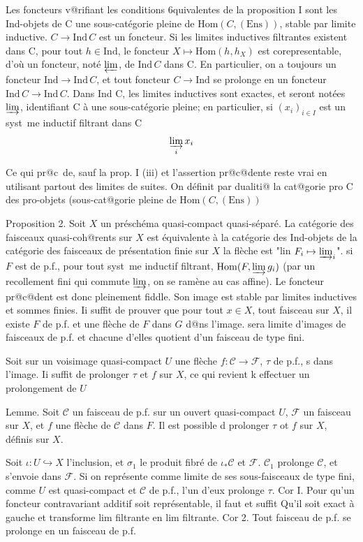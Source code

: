 \documentclass[12pt]{article}
\begin{document}
Les foncteurs v@rifiant les conditions 6quivalentes de la proposition I sont les Ind-objets de C une sous-catégorie pleine de $\mathrm{Hom}(C,(\mathrm{Ens}))$, stable par limite inductive.
$C \to \mathrm{Ind}\,C$ est un foncteur.
Si les limites inductives filtrantes existent dans C, pour tout $h\in\mathrm{Ind}$, le foncteur $X \mapsto \mathrm{Hom}(h,h_X)$ est corepresentable, d'où un foncteur, noté $\varprojlim$, de $\mathrm{Ind}\,C$ dans C.
En particulier, on a toujours un foncteur $\mathrm{Ind}\to\mathrm{Ind}\,C$, et tout foncteur $C\to\mathrm{Ind}$ se prolonge en un foncteur $\mathrm{Ind}\,C\to\mathrm{Ind}\,C$.
Dans Ind C, les limites inductives sont exactes, et seront notées $\varinjlim$, identifiant C à une sous-catégorie pleine; en particulier, si $(x_i)_{i\in I}$ est un syst~me inductif filtrant dans C
\[
\varinjlim_{i} x_{i}
\]

Ce qui pr@c~de, sauf la prop. I (iii) et l'assertion pr@c@dente reste vrai en utilisant partout des limites de suites.
On définit par dualiti@ la cat@gorie pro C des pro-objets (sous-cat@gorie pleine de $\mathrm{Hom}(C,(\mathrm{Ens}))$

Proposition 2. Soit $X$ un préschéma quasi-compact quasi-séparé. La catégorie des faisceaux quasi-coh@rents sur $X$ est équivalente à la catégorie des Ind-objets de la catégorie des faisceaux de présentation finie sur $X$
la flèche est "lin $F_i \mapsto \varinjlim_i$".
si $F$ est de p.f., pour tout syst~me inductif filtrant, $\mathrm{Hom}(F,\varinjlim g_i)$ (par un recollement fini qui commute $\varinjlim$, on se ramène au cas affine).
Le foncteur pr@c@dent est donc pleinement fiddle. Son image est stable par limites inductives et sommes finies.
Ii suffit de prouver que pour tout $x \in X$, tout faisceau sur $X$, il existe $F$ de p.f. et une flèche de $F$ dans $G$ d@ns l'image.
sera limite d'images de faisceaux de p.f. et chacune d'elles quotient d'un faisceau de type fini.

Soit sur un voisimage quasi-compact $U$ une flèche $f: \mathscr{C} \to \mathscr{F}$, $\tau$ de p.f., s dans l'image.
Ii suffit de prolonger $\tau$ et $f$ sur $X$, ce qui revient k effectuer un prolongement de $U$

Lemme. Soit $\mathscr{C}$ un faisceau de p.f. sur un ouvert quasi-compact $U$, $\mathscr{F}$ un faisceau sur $X$, et $f$ une flèche de $\mathscr{C}$ dans $F$.
Il est possible d prolonger $\tau$ ot $f$ sur $X$, définis sur $X$.

Soit $\iota:U\hookrightarrow X$ l'inclusion, et $\sigma_1$ le produit fibré de $\iota_*\mathscr{C}$ et $\mathscr{F}$.
$\mathscr{C}_1$ prolonge $\mathscr{C}$, et s'envoie dans $\mathscr{F}$.
Si on représente comme limite de ses sous-faisceaux de type fini, comme $U$ est quasi-compact et $\mathscr{C}$ de p.f., l'un d'eux prolonge $\tau$.
Cor I. Pour qu'un foncteur contravariant additif soit représentable, il faut et suffit Qu'il soit exact à gauche et transforme lim filtrante en lim filtrante.
Cor 2. Tout faisceau de p.f. se prolonge en un faisceau de p.f.
\end{document}
